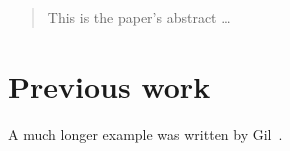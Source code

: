 \documentclass[12pt]{article}
\begin{document}
\maketitle
\newpage
\tableofcontents
\newpage
\listoffigures
\newpage
\listoftables
\newpage

\begin{abstract}
This is the paper's abstract \ldots
\end{abstract}

\newpage
\newpage
\newpage
\newpage
\newpage
\newpage
\newpage

\newpage
\section{Previous work}%
A much longer \LaTeXe{} example was written by Gil~\cite{Gil:02}.



\end{document}
